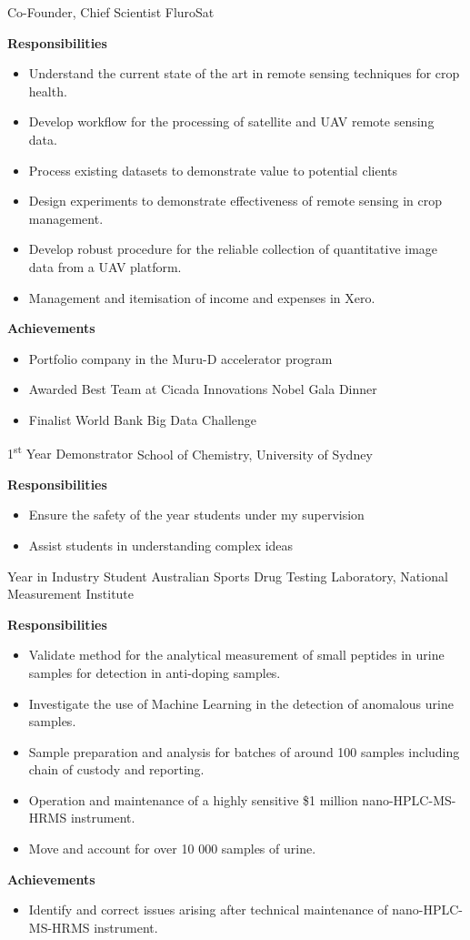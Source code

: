 {Co-Founder, Chief Scientist}
{FluroSat}{}{}
{%
\textbf{Responsibilities}
  \begin{itemize}
    \item Understand the current state of the art in remote sensing techniques for crop health.
    \item Develop workflow for the processing of satellite and UAV remote sensing data.
    \item Process existing datasets to demonstrate value to potential clients
    \item Design experiments to demonstrate effectiveness of remote sensing in crop management.
    \item Develop robust procedure for the reliable collection of quantitative image data from a UAV platform.
    \item Management and itemisation of income and expenses in Xero.
  \end{itemize}
  \textbf{Achievements}
  \begin{itemize}
    \item Portfolio company in the Muru-D accelerator program
    \item Awarded Best Team at Cicada Innovations Nobel Gala Dinner
    \item Finalist World Bank Big Data Challenge
  \end{itemize}
}

{1\textsuperscript{st} Year Demonstrator}
{School of Chemistry, University of Sydney}
{}{}
{%
\textbf{Responsibilities}
    \begin{itemize}
      \item Ensure the safety of the  year students under my supervision
        \item Assist students in understanding complex ideas
    \end{itemize}
}

{Year in Industry Student}
{Australian Sports Drug Testing Laboratory, National Measurement Institute}
{}{}
{%
\textbf{Responsibilities}
  \begin{itemize}
    \item Validate method for the analytical measurement of small peptides in urine samples
      for detection in anti-doping samples.
    \item Investigate the use of Machine Learning in the detection of anomalous urine samples.
    \item Sample preparation and analysis for batches of around 100 samples including chain of custody and reporting.
    \item Operation and maintenance of a highly sensitive \$1 million nano-HPLC-MS-HRMS instrument.
    \item Move and account for over 10 000 samples of urine.
  \end{itemize}
  \textbf{Achievements}
  \begin{itemize}
    \item Identify and correct issues arising after technical maintenance of nano-HPLC-MS-HRMS instrument.
  \end{itemize}
}

